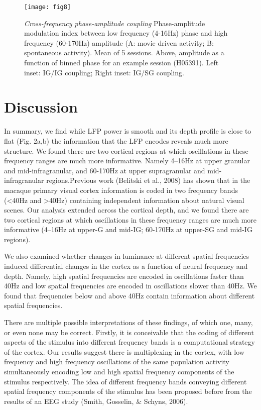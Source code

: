 \begin{figure}[htbp]
\centering \texttt{[image: fig8]}
%
\caption{%
\textit{Cross-frequency phase-amplitude coupling}
Phase-amplitude modulation index between low frequency (4-16Hz) phase and high 
frequency (60-170Hz) amplitude (A: movie driven activity; B: spontaneous 
activity).
Mean of 5 sessions.
Above, amplitude as a function of binned phase for an example session (H05391).
Left inset: \ac{IG}/\ac{IG} coupling; Right inset: \ac{IG}/\ac{SG} coupling.}%
\label{fig:lam_8}
%
\end{figure}

\section{Discussion}
In summary, we find while \ac{LFP} power is smooth and its depth profile is close to flat (Fig.
2a,b) the information that the \ac{LFP} encodes reveals much more structure.
We found there are two cortical regions at which oscillations in these frequency ranges are much more informative.
Namely 4--16Hz at upper granular and mid-infragranular, and 60-170Hz at upper supragranular and mid{}-infragranular regions.Previous work (Belitski et al., 2008) has shown that in the macaque primary visual cortex information is coded in two frequency bands ({\textless}40Hz and {\textgreater}40Hz) containing independent information about natural visual scenes.
Our analysis extended across the cortical depth, and we found there are two cortical regions at which oscillations in these frequency ranges are much more informative (4--16Hz at upper-\ac{G} and mid-\ac{IG}; 60-170Hz at upper-\ac{SG} and mid-\ac{IG} regions).

We also examined whether changes in luminance at different spatial frequencies induced differential changes in the cortex as a function of neural frequency and depth.
Namely, high spatial frequencies are encoded in oscillations faster than 40Hz and low spatial frequencies are encoded in oscillations slower than 40Hz.
We found that frequencies below and above 40Hz contain information about different spatial frequencies.

There are multiple possible interpretations of these findings, of which one, many, or even none may be correct.
Firstly, it is conceivable that the coding of different aspects of the stimulus into different frequency bands is a computational strategy of the cortex.
Our results suggest there is multiplexing in the cortex, with low frequency and high frequency oscillations of the same population activity simultaneously encoding low and high spatial frequency components of the stimulus respectively.
The idea of different frequency bands conveying different spatial frequency components of the stimulus has been proposed before from the results of an \ac{EEG} study (Smith, Gosselin, \& Schyns, 2006).

